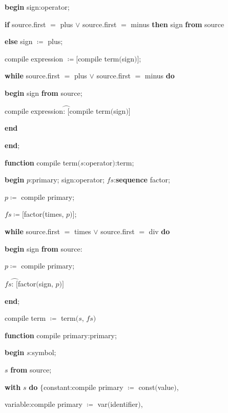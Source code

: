 \documentclass[twoside,11pt,fontset=none]{ctexbook}
\let\wideparen\overparen
\begin{document}
\noindent
\quad \textbf{begin} sign:operator;

\noindent
\quad \quad \textbf{if} source.first $=$ plus $\vee$ source.first $=$ minus \textbf{then} sign \textbf{from} source

\noindent
\quad \quad \textbf{else} sign $\coloneq$ plus;

\noindent
\quad \quad compile expression $\coloneq [$compile term$($sign$)]$;

\noindent
\quad \quad \textbf{while} source.first $=$ plus $\vee$ source.first $=$ minus \textbf{do}

\noindent
\quad \quad \quad \textbf{begin} sign \textbf{from} source;

\noindent
\quad \quad \quad \quad compile expression$\wideparen{\text{:\ }[}$compile term$($sign$)]$

\noindent
\quad \quad \quad \textbf{end}

\noindent
\quad \textbf{end};

\noindent
\textbf{function} compile term$(s$:operator$)$:term;

\noindent
\quad \textbf{begin} $p$:primary; sign:operator; $fs$:\textbf{sequence} factor;

\noindent
\quad \quad $p\coloneq$ compile primary;

\noindent
\quad \quad $fs \coloneq [$factor(times, $p)]$;

\noindent
\quad \quad \textbf{while} source.first $=$ times $\vee$ source.first $=$ div \textbf{do}

\noindent
\quad \quad \quad \textbf{begin} sign \textbf{from} source:

\noindent
\quad \quad \quad \quad $p\coloneq$ compile primary;

\noindent
\quad \quad \quad \quad $fs\wideparen{\text{: }[}$factor$($sign, $p)]$

\noindent
\quad \quad \quad \textbf{end};

\noindent
\quad \quad compile term $\coloneq$ term$(s$, $fs)$

\noindent
\textbf{function} compile primary:primary;

\noindent
\quad \textbf{begin} $s$:symbol;

\noindent
\quad \quad $s$ \textbf{from} source;

\noindent
\quad \quad \textbf{with} $s$ \textbf{do} $\{$constant:compile primary $\coloneq$ const$($value$)$,

\noindent
\quad \quad \quad variable:compile primary $\coloneq$ var$($identifier$)$,
\end{document}
